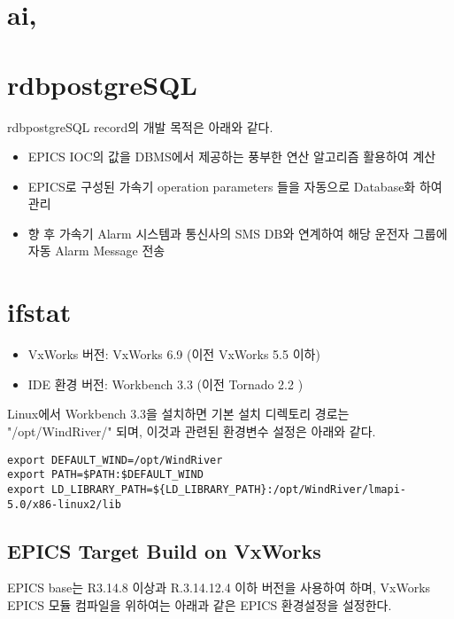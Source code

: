 \documentclass[11pt
  , a4paper
  , article
  , oneside
]{memoir}
\begin{document}
\clearpage


\chapter{ai, }

\chapter{rdbpostgreSQL}

rdbpostgreSQL record의 개발 목적은 아래와 같다.
\begin{itemize}
	\item EPICS IOC의 값을 DBMS에서 제공하는 풍부한 연산 알고리즘 활용하여 계산
	\item EPICS로 구성된 가속기 operation parameters 들을 자동으로 Database화 하여 관리
	\item 향 후 가속기 Alarm 시스템과 통신사의 SMS DB와 연계하여 해당 운전자 그룹에 자동 Alarm Message 전송
\end{itemize}


\chapter{ifstat}



\begin{itemize}
	\item VxWorks 버전: VxWorks 6.9 (이전 VxWorks 5.5 이하)
	\item IDE 환경 버전: Workbench 3.3 (이전 Tornado 2.2 )
\end{itemize}

Linux에서 Workbench 3.3을 설치하면 기본 설치 디렉토리 경로는 "/opt/WindRiver/" 되며, 이것과 관련된 환경변수 설정은 아래와 같다.

\begin{lstlisting}[style=termstyle]
export DEFAULT_WIND=/opt/WindRiver
export PATH=$PATH:$DEFAULT_WIND
export LD_LIBRARY_PATH=${LD_LIBRARY_PATH}:/opt/WindRiver/lmapi-5.0/x86-linux2/lib
\end{lstlisting}

\section{EPICS Target Build on VxWorks}
EPICS base는 R3.14.8 이상과 R.3.14.12.4 이하 버전을 사용하여 하며, VxWorks EPICS 모듈 컴파일을 위하여는 아래과 같은 EPICS 환경설정을 설정한다.
\end{document}
